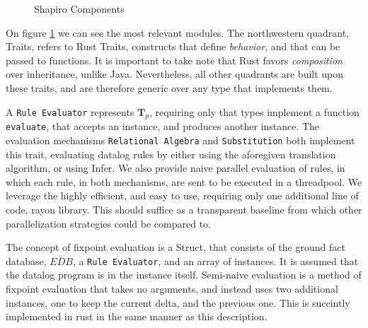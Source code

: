 \documentclass[manuscript,screen,review]{acmart}
\theoremstyle{definition}
\begin{document}
\begin{figure} [htb!]
	\caption{Shapiro Components}
	\label{fig:shapiro_comp}
\end{figure}
On figure \ref{fig:shapiro_comp} we can see the most relevant modules. The northwestern quadrant, Traits, refers to Rust Traits, constructs that
define \textit{behavior}, and that can be passed to functions. It is important to take note that Rust favors \textit{composition} over inheritance, unlike Java.
Nevertheless, all other quadrants are built upon these traits, and are therefore generic over any type that implements them.

A \verb|Rule Evaluator| represents $\textbf{T}_p$, requiring only that types implement a function \verb|evaluate|, that accepts an instance,
and produces another instance. The evaluation mechanisms \verb|Relational Algebra| and \verb|Substitution| both implement this trait,
evaluating datalog rules by either using the aforegiven translation algorithm, or using Infer. We also provide naive parallel evaluation of rules,
in which each rule, in both mechanisms, are sent to be executed in a threadpool. We leverage the highly efficient, and easy to use, requiring
only one additional line of code, rayon\cite{rayon} library. This should suffice as a transparent baseline from which other parallelization
strategies could be compared to.

The concept of fixpoint evaluation is a Struct, that consists of the ground fact database, $EDB$, a \verb|Rule Evaluator|, and an array of
instances. It is assumed that the datalog program is in the instance itself. Semi-naive evaluation is a method of fixpoint evaluation that takes
no arguments, and instead uses two additional instances, one to keep the current delta, and the previous one. This is succintly implemented in rust
in the same manner as this description.
\end{document}
